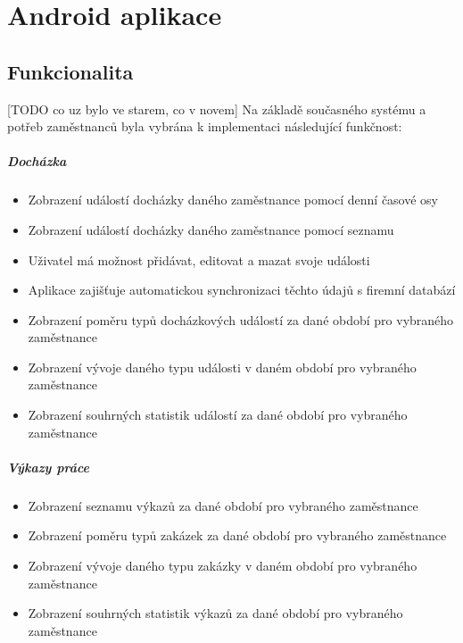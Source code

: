 \documentclass{diplomka}
\begin{document}
\chapter{Android aplikace}

\section{Funkcionalita}
[TODO co uz bylo ve starem, co v novem]
Na základě současného systému a potřeb zaměstnanců byla vybrána k implementaci následující funkčnost: 

\paragraph{Docházka}
\begin{itemize}[noitemsep,nolistsep]
\item Zobrazení událostí docházky daného zaměstnance pomocí denní časové osy
\item Zobrazení událostí docházky daného zaměstnance pomocí seznamu
\item Uživatel má možnost přidávat, editovat a mazat svoje události
\item Aplikace zajišťuje automatickou synchronizaci těchto údajů s firemní databází
\item Zobrazení poměru typů docházkových událostí za dané období pro vybraného zaměstnance
\item Zobrazení vývoje daného typu události v daném období pro vybraného zaměstnance
\item Zobrazení souhrných statistik událostí za dané období pro vybraného zaměstnance
\end{itemize}

\paragraph{Výkazy práce}
\begin{itemize}[noitemsep,nolistsep]
\item Zobrazení seznamu výkazů za dané období pro vybraného zaměstnance
\item Zobrazení poměru typů zakázek za dané období pro vybraného zaměstnance
\item Zobrazení vývoje daného typu zakázky v daném období pro vybraného zaměstnance
\item Zobrazení souhrných statistik výkazů za dané období pro vybraného zaměstnance
\end{itemize}
\end{document}

